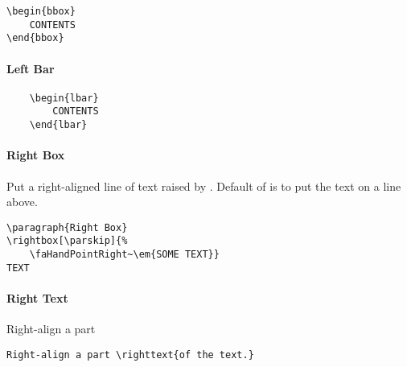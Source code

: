 \documentclass[itdr]{subfiles}
\begin{document}
\skipline[0.5\baselineskip]

\begin{lstlisting}
\begin{bbox}
	CONTENTS
\end{bbox}
\end{lstlisting}

\vfill

\begin{lbar}
	\paragraph{Left Bar}
	\lipsum[66]\tight
\end{lbar}

\skipline[0.25\baselineskip]

\begin{lstlisting}
	\begin{lbar}
		CONTENTS
	\end{lbar}
\end{lstlisting}

\vfill

\paragraph{Right Box}
Put a right-aligned line of text raised by .
Default of  is \fbox{\lstinline!\\parskip!} to put the text on a \fbox{\lstinline!\\paragraph!} line above.

\skipline[0.25\baselineskip]

\begin{lstlisting}
\paragraph{Right Box}
\rightbox[\parskip]{%
	\faHandPointRight~\em{SOME TEXT}}
TEXT
\end{lstlisting}

\vfill

\paragraph{Right Text}

Right-align a part 

\begin{lstlisting}
Right-align a part \righttext{of the text.}
\end{lstlisting}
\end{document}
